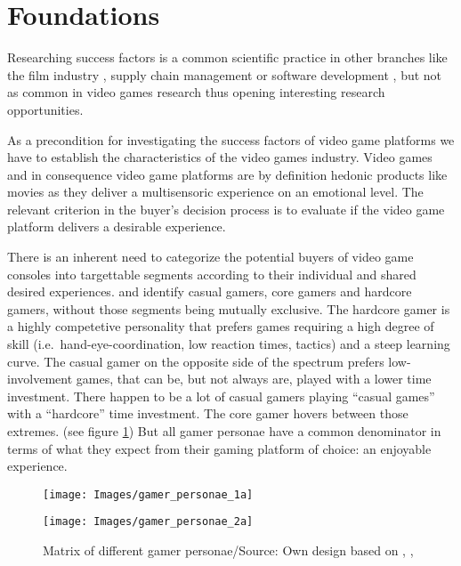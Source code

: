 \documentclass
[
    a4paper,
    11pt
]
{article}
\begin{document}
\section{Foundations}
\label{foundations}
%
Researching success factors is a common scientific
practice\cite{Leidecker1984} in other branches like the film industry
\cite{Hennig-Thurau2001}, supply chain management \cite{Power2001} or
software development \cite{Reel1999}, but not as common in video games
research thus opening interesting research opportunities.

As a precondition for investigating the success factors of video game
platforms we have to establish the characteristics of the video games
industry. Video games and in consequence video game platforms are by definition
hedonic products like movies as they deliver a
multisensoric experience on an emotional level. The relevant criterion
in the buyer's decision process is to evaluate if the video game
platform delivers a desirable experience. \cite{Hirschman1982}

There is an inherent need to categorize the potential buyers of video
game consoles into targettable segments according to their individual
and shared desired experiences. \cite{Kuittinen2007} and \cite{IGDA2006}
identify casual gamers, core gamers and hardcore gamers, without those
segments being mutually exclusive. The hardcore gamer is a highly
competetive personality that prefers games requiring a high degree of
skill (i.e.~hand-eye-coordination, low reaction times, tactics) and a
steep learning curve. The casual gamer on the opposite side of the
spectrum prefers low-involvement games, that can be, but not always are, played with a lower
time investment. There happen to be a lot of casual gamers playing ``casual games'' with a ``hardcore'' time
investment. \cite{Kuittinen2007} The core gamer hovers between those
extremes. \cite{Scharkow2015} (see figure \ref{fig:personae})
But all gamer personae have a common denominator in terms of what they expect
from their gaming platform of choice: an enjoyable experience.

\begin{figure}[ht]
\centering
    \begin{subfloat}
        \texttt{[image: Images/gamer\_personae\_1a]}
    \end{subfloat}
    \begin{subfloat}
        \texttt{[image: Images/gamer\_personae\_2a]}
    \end{subfloat}
    \caption{Matrix of different gamer personae/Source: Own design based on
    \cite{Kuittinen2007}, \cite{IGDA2006}, \cite{Juul2009}}
    \label{fig:personae}
\end{figure}
\end{document}
